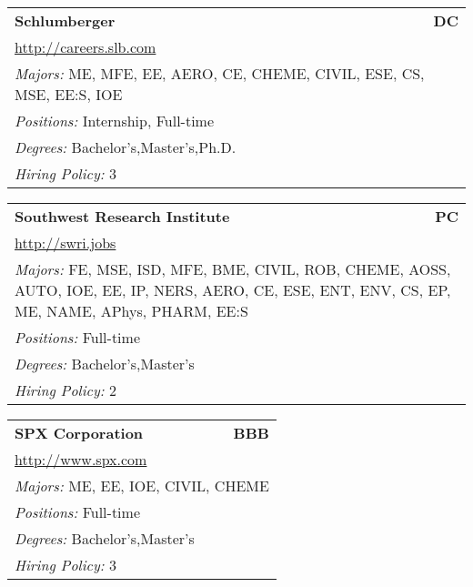 \documentclass[twoside]{article}
\begin{document}
\begin{center}
\begin{multicols}{3}
\begin{FlushLeft}
\begin{minipage}{\columnwidth}
\end{minipage}
 
\begin{minipage}{\columnwidth}\begin{tabularx}{.95\columnwidth}{Xr}
                 {\Large\bf Schlumberger} & {\Large\bf DC}\\
    \multicolumn{2}{p{.95\columnwidth}}{\url{http://careers.slb.com}}\\
    \multicolumn{2}{p{.95\columnwidth}}{\emph{Majors:} ME, MFE, EE, AERO, CE, CHEME, CIVIL, ESE, CS, MSE, EE:S, IOE}\\
    \multicolumn{2}{p{.95\columnwidth}}{\emph{Positions:} Internship, Full-time}\\
    \multicolumn{2}{p{.95\columnwidth}}{\emph{Degrees:} Bachelor's,Master's,Ph.D.}\\
    \multicolumn{2}{p{.95\columnwidth}}{\emph{Hiring Policy:} 3}\\
    \end{tabularx}
    
\end{minipage}
 
\begin{minipage}{\columnwidth}\begin{tabularx}{.95\columnwidth}{Xr}
                 {\Large\bf Southwest Research Institute} & {\Large\bf PC}\\
    \multicolumn{2}{p{.95\columnwidth}}{\url{http://swri.jobs}}\\
    \multicolumn{2}{p{.95\columnwidth}}{\emph{Majors:} FE, MSE, ISD, MFE, BME, CIVIL, ROB, CHEME, AOSS, AUTO, IOE, EE, IP, NERS, AERO, CE, ESE, ENT, ENV, CS, EP, ME, NAME, APhys, PHARM, EE:S}\\
    \multicolumn{2}{p{.95\columnwidth}}{\emph{Positions:} Full-time}\\
    \multicolumn{2}{p{.95\columnwidth}}{\emph{Degrees:} Bachelor's,Master's}\\
    \multicolumn{2}{p{.95\columnwidth}}{\emph{Hiring Policy:} 2}\\
    \end{tabularx}
    
\end{minipage}
 
\begin{minipage}{\columnwidth}\begin{tabularx}{.95\columnwidth}{Xr}
                 {\Large\bf SPX Corporation} & {\Large\bf BBB}\\
    \multicolumn{2}{p{.95\columnwidth}}{\url{http://www.spx.com}}\\
    \multicolumn{2}{p{.95\columnwidth}}{\emph{Majors:} ME, EE, IOE, CIVIL, CHEME}\\
    \multicolumn{2}{p{.95\columnwidth}}{\emph{Positions:} Full-time}\\
    \multicolumn{2}{p{.95\columnwidth}}{\emph{Degrees:} Bachelor's,Master's}\\
    \multicolumn{2}{p{.95\columnwidth}}{\emph{Hiring Policy:} 3}\\
    \end{tabularx}
    

\end{minipage}
\end{FlushLeft}
\end{multicols}
\end{center}
\end{document}

